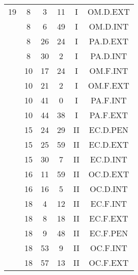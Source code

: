 \documentclass[12pt, a4paper]{article}
\begin{document}
\begin{multicols}{3}
{\begin{tabular}{c c c c c c}
	 	 	 	19 & 8 & 3 & 11 & I & OM.D.EXT\\%
	 	 	 	 & 8 & 6 & 49 & I & OM.D.INT\\%
	 	 	 	 & 8 & 26 & 24 & I & PA.D.EXT\\%
	 	 	 	 & 8 & 30 & 2 & I & PA.D.INT\\%
	 	 	 	 & 10 & 17 & 24 & I & OM.F.INT\\%
	 	 	 	 & 10 & 21 & 2 & I & OM.F.EXT\\%
	 	 	 	 & 10 & 41 & 0 & I & PA.F.INT\\%
	 	 	 	 & 10 & 44 & 38 & I & PA.F.EXT\\%
	 	 	 	 & 15 & 24 & 29 & II & EC.D.PEN\\%
	 	 	 	 & 15 & 25 & 59 & II & EC.D.EXT\\%
	 	 	 	 & 15 & 30 & 7 & II & EC.D.INT\\%
	 	 	 	 & 16 & 11 & 59 & II & OC.D.EXT\\%
	 	 	 	 & 16 & 16 & 5 & II & OC.D.INT\\%
	 	 	 	 & 18 & 4 & 12 & II & EC.F.INT\\%
	 	 	 	 & 18 & 8 & 18 & II & EC.F.EXT\\%
	 	 	 	 & 18 & 9 & 48 & II & EC.F.PEN\\%
	 	 	 	 & 18 & 53 & 9 & II & OC.F.INT\\%
	 	 	 	 & 18 & 57 & 13 & II & OC.F.EXT\\%
	 	 \end{tabular}
 	}
\end{multicols}
\end{document}
